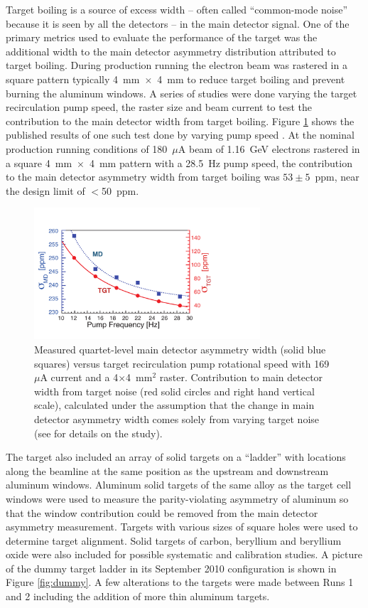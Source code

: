 Target boiling is a source of excess width -- often called ``common-mode noise'' because it is seen by all the detectors -- in the main detector signal. One of the primary metrics used to evaluate the performance of the target was the additional width to the main detector asymmetry distribution attributed to target boiling. During production running the electron beam was rastered in a square pattern typically 4~mm~$\times$~4~mm to reduce target boiling and prevent burning the aluminum windows. A series of studies were done varying the target recirculation pump speed, the raster size and beam current to test the contribution to the main detector width from target boiling. Figure \ref{fig:boiling} shows the published results of one such test done by varying pump speed \cite{QweakNIM}. At the nominal \Qs production running conditions of 180~$\mu$A beam of 1.16~GeV electrons rastered in a square 4~mm~$\times$~4~mm pattern with a 28.5~Hz pump speed, the contribution to the main detector asymmetry width from target boiling was $53\pm5$~ppm, near the design limit of $<$50~ppm. 

\begin{figure}[hhbt]
\hspace*{0.75cm}
\centerline{\includegraphics[width=0.75\textwidth,angle=0]{Pictures/pumpscan-eps-converted-to.pdf}}
\caption{\label{fig:boiling} Measured quartet-level main detector asymmetry width (solid blue squares) versus target recirculation pump rotational speed with 169~$\mu$A current and a 4$\times$4~mm$^2$ raster. Contribution to main detector width from target noise (red solid circles and right hand vertical scale), calculated under the assumption that the change in main detector asymmetry width comes solely from varying target noise (see \cite{Smith} for details on the study).}
\end{figure}

The target also included an array of solid targets on a ``ladder'' with locations along the beamline at the same position as the upstream and downstream aluminum windows. Aluminum solid targets of the same alloy as the target cell windows were used to measure the parity-violating asymmetry of aluminum  so that the window contribution could be removed from the main detector asymmetry measurement. Targets with various sizes of square holes were used to determine target alignment. Solid targets of carbon, beryllium and beryllium oxide were also included for possible systematic and calibration studies. A picture of the dummy target ladder in its September 2010 configuration is shown in Figure \ref{fig:dummy}. A few alterations to the targets were made between Runs 1 and 2 including the addition of more thin aluminum targets.

